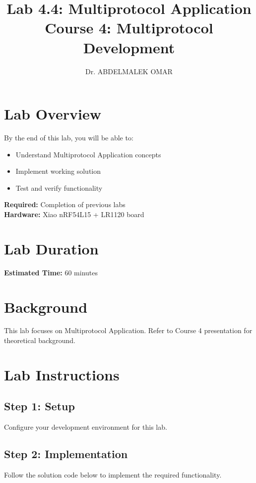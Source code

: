 \documentclass[11pt,a4paper]{article}
\title{\textbf{Lab 4.4: Multiprotocol Application}\\
\large Course 4: Multiprotocol Development}
\author{Dr. ABDELMALEK OMAR}
\date{}
\begin{document}
\maketitle
\thispagestyle{fancy}

\section{Lab Overview}

\begin{objectivebox}
By the end of this lab, you will be able to:
\begin{itemize}
    \item Understand Multiprotocol Application concepts
    \item Implement working solution
    \item Test and verify functionality
\end{itemize}
\end{objectivebox}

\begin{prereqbox}
\textbf{Required:} Completion of previous labs\\
\textbf{Hardware:} Xiao nRF54L15 + LR1120 board
\end{prereqbox}

\section{Lab Duration}
\textbf{Estimated Time:} 60 minutes

\section{Background}

This lab focuses on Multiprotocol Application. Refer to Course 4 presentation for theoretical background.

\section{Lab Instructions}

\subsection{Step 1: Setup}
Configure your development environment for this lab.

\subsection{Step 2: Implementation}
Follow the solution code below to implement the required functionality.
\end{document}

